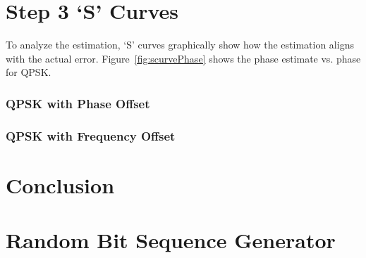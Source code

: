 \documentclass[]{article}
\begin{document}
\section{Step 3 `S' Curves}
\label{sec:scurves}
To analyze the estimation, `S' curves graphically show how the estimation aligns with the actual error.  Figure~\ref{fig:scurvePhase} shows the phase estimate vs. phase for QPSK.   


\subsubsection{QPSK with Phase Offset}
\label{sec:s_phase}

\subsubsection{QPSK with Frequency Offset}
\label{sec:s_freq}


\newpage
\section{Conclusion}
\label{sec:conc}

\appendix
\newpage


\newpage
%


\section{Random Bit Sequence Generator}
\label{app:random_bit_generator}

\end{document}
